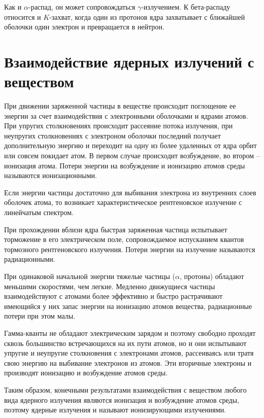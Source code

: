 \documentclass[14pt,pscyr,titlepage]{hedreport}
\begin{document}
		Как и \( \alpha \)-распад, он может сопровождаться 
		\( \gamma \)-излучением. К бета-распаду относится и \( K \)-захват, 
		когда один из протонов ядра захватывает с ближайшей оболочки один 
		электрон и превращается в нейтрон.

	\section{Взаимодействие ядерных излучений с веществом}
		При движении заряженной частицы в веществе происходит поглощение ее 
		энергии за счет взаимодействия с электронными оболочками и ядрами 
		атомов. При упругих столкновениях происходит рассеяние потока 
		излучения, при неупругих столкновениях с электроном оболочки последний 
		получает дополнительную энергию и переходит на одну из более удаленных 
		от ядра орбит или совсем покидает атом. В первом случае происходит 
		возбуждение, во втором -- ионизация атома. Потери энергии на 
		возбуждение и ионизацию атомов среды называются ионизационными.

		Если энергии частицы достаточно для выбивания электрона из внутренних 
		слоев оболочек атома, то возникает характеристическое рентгеновское 
		излучение с линейчатым спектром. 

		При прохождении вблизи ядра быстрая заряженная частица испытывает 
		торможение в его электрическом поле, сопровождаемое испусканием квантов 
		тормозного рентгеновского излучения. Потери энергии на излучение 
		называются радиационными. 

		При одинаковой начальной энергии тяжелые частицы (\( \alpha \), 
		протоны) обладают меньшими скоростями, чем легкие. Медленно движущиеся 
		частицы взаимодействуют с атомами более эффективно и быстро 
		растрачивают имеющийся у них запас энергии на ионизацию атомов 
		вещества, радиационные потери при этом малы.

		Гамма-кванты не обладают электрическим зарядом и поэтому свободно 
		проходят сквозь большинство встречающихся на их пути атомов, но и 
		они испытывают упругие и неупругие столкновения с электронами атомов, 
		рассеиваясь или тратя свою энергию на выбивание электронов из 
		атомов. Эти вторичные электроны и производят ионизацию и возбуждение 
		атомов среды.

        Таким образом, конечными результатами взаимодействия с веществом 
        любого вида ядерного излучения являются ионизация и возбуждение атомов 
        среды, поэтому ядерные излучения и называют ионизирующими излучениями.
\end{document}
